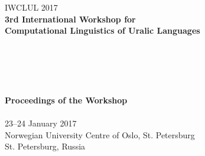 \documentclass[11pt]{article}
\begin{document}
  \begin{center}
  \LARGE IWCLUL 2017 \\
  \vspace*{55mm}
    {\bf
    \LARGE
    3rd International Workshop for \\
    Computational Linguistics of Uralic Languages\\ \hspace*{1cm}\\ \hspace*{1cm} \\
    \hspace*{1cm} \\ \hspace*{1cm}\\
    \hspace*{1cm}\\
    \vspace{2cm}
    \LARGE
    Proceedings of the Workshop\\
    \vspace{2cm}
    \hspace*{1cm}} \\ %
    \vspace{43mm}
    \LARGE
    23--24 January 2017 \\
    Norwegian University Centre of Oslo, St. Petersburg\\
    St. Petersburg, Russia
  \end{center}
\end{document}
